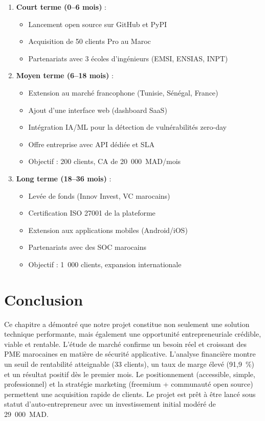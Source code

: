 \documentclass[12pt,a4paper]{report}
\begin{document}
\begin{enumerate}
  \item \textbf{Court terme (0--6 mois)} :
  \begin{itemize}
    \item Lancement open source sur GitHub et PyPI
    \item Acquisition de 50 clients Pro au Maroc
    \item Partenariats avec 3 écoles d'ingénieurs (EMSI, ENSIAS, INPT)
  \end{itemize}

  \item \textbf{Moyen terme (6--18 mois)} :
  \begin{itemize}
    \item Extension au marché francophone (Tunisie, Sénégal, France)
    \item Ajout d'une interface web (dashboard SaaS)
    \item Intégration IA/ML pour la détection de vulnérabilités zero-day
    \item Offre entreprise avec API dédiée et SLA
    \item Objectif : 200 clients, CA de 20~000~MAD/mois
  \end{itemize}

  \item \textbf{Long terme (18--36 mois)} :
  \begin{itemize}
    \item Levée de fonds (Innov Invest, VC marocains)
    \item Certification ISO 27001 de la plateforme
    \item Extension aux applications mobiles (Android/iOS)
    \item Partenariats avec des SOC marocains
    \item Objectif : 1~000 clients, expansion internationale
  \end{itemize}
\end{enumerate}

\section{Conclusion}

Ce chapitre a démontré que notre projet constitue non seulement une solution technique performante,
mais également une opportunité entrepreneuriale crédible, viable et rentable. L'étude de marché
confirme un besoin réel et croissant des PME marocaines en matière de sécurité applicative.
L'analyse financière montre un seuil de rentabilité atteignable (33 clients), un taux de marge
élevé (91,9~\%) et un résultat positif dès le premier mois. Le positionnement
(accessible, simple, professionnel) et la stratégie marketing (freemium + communauté open source)
permettent une acquisition rapide de clients. Le projet est prêt à être lancé sous statut
d'auto-entrepreneur avec un investissement initial modéré de 29~000~MAD.
\end{document}
